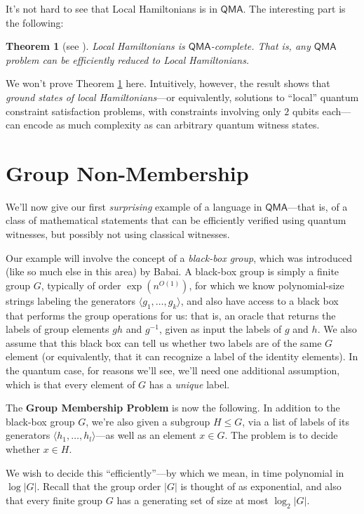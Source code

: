 \documentclass[11pt]{report}
\theoremstyle{plain}
\newtheorem{theorem}{Theorem}[section]
\theoremstyle{definition}
\begin{document}
It's not hard to see that Local Hamiltonians is in $\mathsf{QMA}$.  The interesting part is the following:

\begin{theorem}[see \cite{KSV02}]
\label{localham}
Local Hamiltonians is $\mathsf{QMA}$-complete.  That is, {\em any} $\mathsf{QMA}$ problem can be efficiently reduced to Local Hamiltonians.
\end{theorem}

We won't prove Theorem \ref{localham} here. Intuitively, however, the result shows that {\em ground states of local Hamiltonians}---or equivalently, solutions to ``local'' quantum constraint satisfaction problems, with constraints involving only $2$ qubits each---can encode as much complexity as can arbitrary quantum witness states.

\section{Group Non-Membership}

We'll now give our first {\em surprising} example of a language in $\mathsf{QMA}$---that is, of a class of mathematical statements that can be efficiently verified using quantum witnesses, but possibly not using classical witnesses.

Our example will involve the concept of a {\em black-box group}, which was introduced (like so much else in this area) by Babai.  A black-box group is simply
a finite group $G$, typically of order $\exp(n^{O(1)})$, for which we know polynomial-size strings labeling the generators $\langle g_1, \dots, g_k \rangle$, and also have access to a black box that performs the group operations for us: that is, an oracle that returns the labels of group elements $gh$ and $g^{-1}$, given as input the labels of $g$ and $h$.  We also assume that this black box can tell us whether two labels are of the same $G$ element (or equivalently, that it can recognize a label of the identity elements).  In the quantum case, for reasons we'll see, we'll need one additional assumption, which is that every element of $G$ has a {\em unique} label.

The \textbf{Group Membership Problem} is now the following.  In addition to the black-box group $G$, we're also given a subgroup $H \leq G$, via a list of labels of its generators $\langle h_1, \dots, h_l\rangle$---as well as an element $x \in G$.  The problem is to decide whether $x \in H$.

We wish to decide this ``efficiently''---by which we mean, in time polynomial in $\log |G|$.  Recall that the group order $|G|$ is thought of as exponential, and also that every finite group $G$ has a generating set of size at most $\log_2 |G|$.
\end{document}
